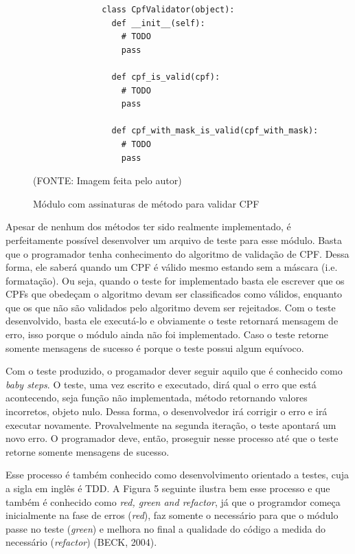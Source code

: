 \documentclass[
    12pt,       %
    openright,      %
    twoside,      %
    a4paper,      %
    english,      %
    french,       %
    spanish,      %
    brazil,       %
    ]{abntex2}
\begin{document}
      \begin{figure}[htpb]
          \begin{lstlisting}
              class CpfValidator(object):
                def __init__(self):
                  # TODO
                  pass

                def cpf_is_valid(cpf):
                  # TODO
                  pass

                def cpf_with_mask_is_valid(cpf_with_mask):
                  # TODO
                  pass
          \end{lstlisting}
          \caption{\label{fig:passaro}Módulo com assinaturas de método para validar CPF}\vspace{-1.2\baselineskip}
          \centering
          \begin{center}(FONTE: Imagem feita pelo autor)\end{center}
      \end{figure}

      Apesar de nenhum dos métodos ter sido realmente implementado, é perfeitamente
      possível desenvolver um arquivo de teste para esse módulo. Basta que o programador
      tenha conhecimento do algoritmo de validação de CPF. Dessa forma, ele saberá quando
      um CPF é válido mesmo estando sem a máscara (i.e. formatação). Ou seja, quando
      o teste for implementado basta ele escrever que os CPFs que obedeçam o algoritmo
      devam ser classificados como válidos, enquanto que os que não são validados pelo
      algoritmo devem ser rejeitados. Com o teste desenvolvido, basta ele executá-lo e
      obviamente o teste retornará mensagem de erro, isso porque o módulo ainda não
      foi implementado. Caso o teste retorne somente mensagens de sucesso é porque o
      teste possui algum equívoco.

      Com o teste produzido, o progamador dever seguir aquilo que é conhecido como
      \textit{baby steps}. O teste, uma vez escrito e executado, dirá qual o erro
      que está acontecendo, seja função não implementada, método retornando valores
      incorretos, objeto nulo. Dessa forma, o desenvolvedor irá corrigir o erro e
      irá executar novamente. Provalvelmente na segunda iteração, o teste apontará
      um novo erro. O programador deve, então, proseguir nesse processo até que o
      teste retorne somente mensagens de sucesso.

      Esse processo é também conhecido como desenvolvimento orientado a testes, cuja
      a sigla em inglês é TDD. A Figura 5 seguinte ilustra bem esse processo e que
      também é conhecido como \textit{red, green and refactor}, já que o programdor
      começa inicialmente na fase de erros (\textit{red}), faz somente o necessário
      para que o módulo passe no teste (\textit{green}) e melhora no final a qualidade
      do código a medida do necessário (\textit{refactor}) (BECK, 2004).
\end{document}
